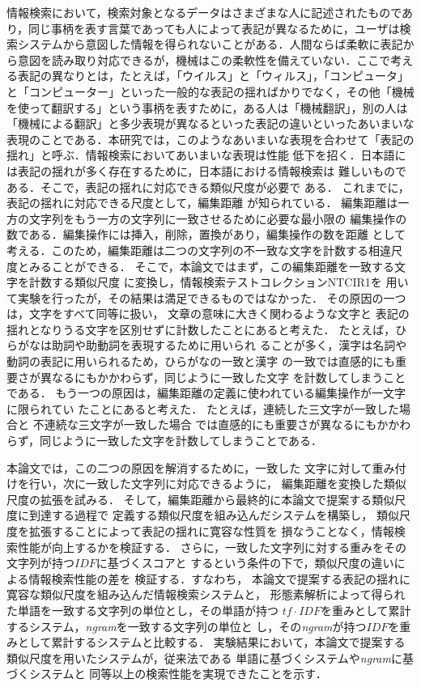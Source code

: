 情報検索において，検索対象となるデータはさまざまな人に記述されたものであり，同じ事柄を表す言葉であっても人によって表記が異なるために，ユーザは検索システムから意図した情報を得られないことがある．人間ならば柔軟に表記から意図を読み取り対応できるが，機械はこの柔軟性を備えていない．ここで考える表記の異なりとは，たとえば，「ウイルス」と「ウィルス」，「コンピュータ」と「コンピューター」といった一般的な表記の揺ればかりでなく，その他「機械を使って翻訳する」という事柄を表すために，ある人は「機械翻訳」，別の人は「機械による翻訳」と多少表現が異なるといった表記の違いといったあいまいな表現のことである．本研究では，このようなあいまいな表現を合わせて「表記の揺れ」と呼ぶ．情報検索においてあいまいな表現は性能
低下を招く．日本語には表記の揺れが多く存在するために，日本語における情報検索は
難しいものである．そこで，表記の揺れに対応できる類似尺度が必要で
ある．
これまでに，表記の揺れに対応できる尺度として，編集距離
\cite{Korfhage97}が知られている．
編集距離は一方の文字列をもう一方の文字列に一致させるために必要な最小限の
編集操作の数である．編集操作には挿入，削除，置換があり，編集操作の数を距離
として考える．このため，編集距離は二つの文字列の不一致な文字を計数する相違尺
度とみることができる．
そこで，本論文ではまず，この編集距離を一致する文字を計数する類似尺度
に変換し，情報検索テストコレクションNTCIR1\cite{Kando98,Kageura97}を
用いて実験を行ったが，その結果は満足できるものではなかった．
その原因の一つは，文字をすべて同等に扱い，
文章の意味に大きく関わるような文字と
表記の揺れとなりうる文字を区別せずに計数したことにあると考えた．
たとえば，ひらがなは助詞や助動詞を表現するために用いられ
ることが多く，漢字は名詞や動詞の表記に用いられるため，ひらがなの一致と漢字
の一致では直感的にも重要さが異なるにもかかわらず，同じように一致した文字
を計数してしまうことである． 
もう一つの原因は，編集距離の定義に使われている編集操作が一文字に限られてい
たことにあると考えた．
たとえば，連続した三文字が一致した場合と
不連続な三文字が一致した場合
では直感的にも重要さが異なるにもかかわ
らず，同じように一致した文字を計数してしまうことである．

本論文では，この二つの原因を解消するために，一致した
文字に対して重み付けを行い，次に一致した文字列に対応できるように，
編集距離を変換した類似尺度の拡張を試みる．
そして，編集距離から最終的に本論文で提案する類似尺度に到達する過程で
定義する類似尺度を組み込んだシステムを構築し，
類似尺度を拡張することによって表記の揺れに寛容な性質を
損なうことなく，情報検索性能が向上するかを検証する．
さらに，一致した文字列に対する重みをその文字列が持つ$IDF$に基づくスコアと
するという条件の下で，類似尺度の違いによる情報検索性能の差を
検証する．すなわち，
本論文で提案する表記の揺れに寛容な類似尺度を組み込んだ情報検索システムと，
形態素解析によって得られた単語を一致する文字列の単位とし，その単語が持つ
$tf\cdot IDF$を重みとして累計するシステム，{\it ngram}を一致する文字列の単位と
し，その{\it ngram}が持つ$IDF$を重みとして累計するシステムと比較する．
実験結果において，本論文で提案する類似尺度を用いたシステムが，従来法である
単語に基づくシステムや{\it ngram}に基づくシステムと
同等以上の検索性能を実現できたことを示す．

